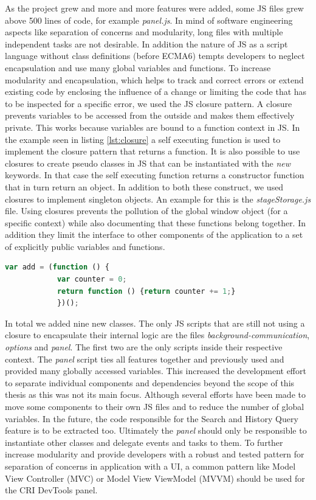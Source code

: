 As the project grew and more and more features were added, some JS files grew above 500 lines of code, for example \emph{panel.js}. In mind of software engineering aspects like separation of concerns and modularity, long files with multiple independent tasks are not desirable. In addition the nature of JS as a script language without class definitions (before ECMA6) tempts developers to neglect encapsulation and use many global variables and functions. To increase modularity and encapsulation, which helps to track and correct errors or extend existing code by enclosing the influence of a change or limiting the code that has to be inspected for a specific error, we used the JS closure pattern. A closure prevents variables to be accessed from the outside and makes them effectively private. This works because variables are bound to a function context in JS. In the example seen in listing \ref{lst:closure} a self executing function is used to implement the closure pattern that returns a function. It is also possible to use closures to create pseudo classes in JS that can be instantiated with the \emph{new} keywords. In that case the self executing function returns a constructor function that in turn return an object. In addition to both these construct, we used closures to implement singleton objects. An example for this is the \emph{stageStorage.js} file. Using closures prevents the pollution of the global window object (for a specific context) while also documenting that these functions belong together. In addition they limit the interface to other components of the application to a set of explicitly public variables and functions.
		\begin{lstlisting}[language=JavaScript, caption={Example of RxJS code.},label={lst:closure}]
			var add = (function () {
			var counter = 0;
			return function () {return counter += 1;}
			})();
		\end{lstlisting}
In total we added nine new classes. The only JS scripts that are still not using a closure to encapsulate their internal logic are the files \emph{background-communication}, \emph{options} and \emph{panel}. The first two are the only scripts inside their respective context. The \emph{panel} script ties all features together and previously used and provided many globally accessed variables. This increased the development effort to separate individual components and dependencies beyond the scope of this thesis as this was not its main focus. Although several efforts have been made to move some components to their own JS files and to reduce the number of global variables. In the future, the code responsible for the Search and History Query feature is to be extracted too. Ultimately the \emph{panel} should only be responsible to instantiate other classes and delegate events and tasks to them. To further increase modularity and provide developers with a robust and tested pattern for separation of concerns in application with a UI, a common pattern like Model View Controller (MVC) or Model View ViewModel (MVVM) should be used for the CRI DevTools panel.
